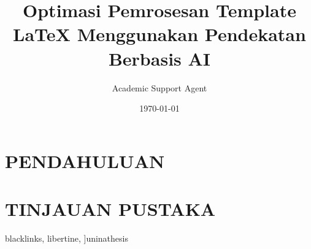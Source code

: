 \documentclass{uninathesis}
\title{Optimasi Pemrosesan Template LaTeX Menggunakan Pendekatan Berbasis AI}
\author{Academic Support Agent}
\date{\today}
\begin{document}
\maketitle

\begin{abstract}

\end{abstract}

\chapter{PENDAHULUAN}


\chapter{TINJAUAN PUSTAKA}


    blacklinks,
    libertine,
]{uninathesis}


\usepackage[english]{babel}
\addto\captionsenglish{%
  \renewcommand{\contentsname}%
    {\sffamily Contents}%
}

\RequirePackage{mathtools}
\RequirePackage{mathrsfs} %
\let\openbox\relax
\RequirePackage{amsthm}
\RequirePackage{stmaryrd} %

\theoremstyle{plain}
\newtheorem{theorem}{Theorem}

\theoremstyle{definition}
\newtheorem{definition}{Definition}
\newtheorem{example}{Example}

\RequirePackage{tikz}
\RequirePackage{pgfplots}
\pgfplotsset{compat=1.16}
\usetikzlibrary{positioning,automata,calc,fit,shapes,backgrounds,arrows.meta}
\usepackage{makecell}

\RequirePackage[utf8]{inputenc}
\usepackage{ marvosym } %
\usepackage{subcaption} %


\RequirePackage{csquotes}
\RequirePackage[sorting=none,maxbibnames=4]{biblatex} %
\end{document}
